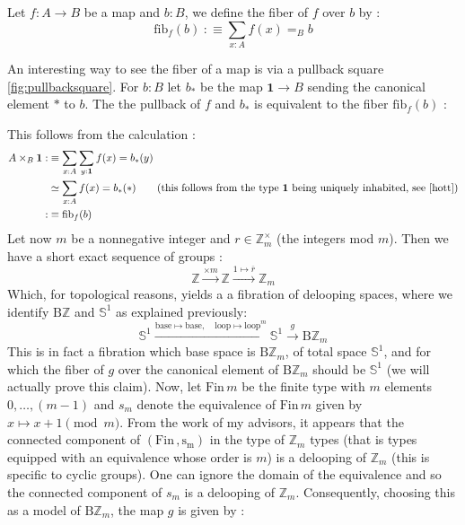 \documentclass{report}
\begin{document}
\begin{mydef}
  Let $f : A \rightarrow B$ be a map and $b : B$, we define the fiber of $f$ over $b$ by : 
  $$\mathrm{fib}_f(b) \hspace{3pt} :\equiv \sum_{x: A} f(x)=_B b$$
\end{mydef}
An interesting way to see the fiber of a map is via a pullback square \ref{fig:pullbacksquare}. For $b :B$ let $b_*$ be the map $\mathbf{1} \rightarrow B$ sending the canonical element $*$ to $b$. The the pullback of $f$ and $b_*$ is equivalent to the fiber $\mathrm{fib}_f(b)$ : 
\begin{center}
\end{center}
This follows from the calculation : 
\begin{align}
A \times_B \textbf{1} :
&\equiv \sum_{x :A} \sum_{y : \textbf{1}} f(x)=b_*(y)\\
&\simeq \sum_{x : A} f(x)=b_*(*) \text{\quad \quad (this follows from the type \textbf{1} being uniquely inhabited, see \cite{hott})}\\
:&\equiv\mathrm{fib}_f(b)
\end{align} 
Let now $m$ be a nonnegative integer and $r \in \mathbb{Z}_m^{\times}$ (the integers mod $m$). Then we have a short exact sequence of groups : 
$$\mathbb{Z} \xrightarrow{\times m} \mathbb{Z} \xrightarrow{1 \mapsto \overline r} \mathbb Z_m$$
Which, for  topological reasons, yields a a fibration of delooping spaces, where we identify $\mathrm{B}\mathbb Z$ and $\mathbb S^1$ as explained previously:
$$\mathbb{S}^1 \xrightarrow{\mathrm{base} \mapsto \mathrm{base}, \quad  \mathrm{loop} \mapsto \mathrm{loop}^m} \mathbb{S}^1 \xrightarrow{g} \mathrm{B}\mathbb{Z}_m$$
This is in fact a fibration which base space is $\mathrm{B}\mathbb{Z}_m$, of total space $\mathbb{S}^1$, and for which the fiber of $g$ over the canonical element of $\mathrm{B}\mathbb{Z}_m$ should be $\mathbb{S}^1$ (we will actually prove this claim). Now, let $\mathrm{Fin} \hspace{2pt} m$ be the finite type with $m$ elements $0,\ldots, (m-1)$ and $s_m$ denote the equivalence of $\mathrm{Fin} \hspace{2pt} m$ given by $x\mapsto x+1 \pmod m$. From the work of my advisors, it appears that the connected component of $(\mathrm{Fin \hspace{2pt}, s_m})$ in the type of $\mathbb Z_m$ types (that is types equipped with an equivalence whose order is $m$) is a delooping of $\mathbb{Z}_m$ (this is specific to cyclic groups). One can ignore the domain of the equivalence and so the connected component of $s_m$ is a delooping of $\mathbb Z_m$. Consequently, choosing this as a model of $\mathrm{B}\mathbb{Z}_m$, the map $g$ is given by : 
\end{document}
